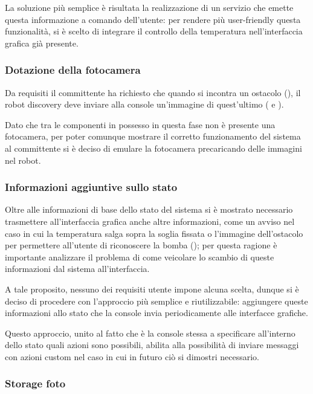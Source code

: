 La soluzione più semplice è risultata la realizzazione di un servizio che emette questa informazione a comando dell'utente:
per rendere più user-friendly questa funzionalità, si è scelto di integrare il controllo della temperatura nell'interfaccia grafica già presente.

\subsubsection{Dotazione della fotocamera}

Da requisiti il committente ha richiesto che quando si incontra un ostacolo (), il robot discovery deve inviare alla console un'immagine di quest'ultimo ( e ).

Dato che tra le componenti in possesso in questa fase non è presente una fotocamera, per poter comunque mostrare il corretto funzionamento del sistema al committente si è deciso di emulare la fotocamera precaricando delle immagini nel robot.

\subsubsection{Informazioni aggiuntive sullo stato}

Oltre alle informazioni di base dello stato del sistema si è mostrato necessario trasmettere all'interfaccia grafica anche altre informazioni, come un avviso nel caso in cui la temperatura salga sopra la soglia fissata o l'immagine dell'ostacolo per permettere all'utente di riconoscere la bomba ();
per questa ragione è importante analizzare il problema di come veicolare lo scambio di queste informazioni dal sistema all'interfaccia.

A tale proposito, nessuno dei requisiti utente impone alcuna scelta, dunque si è deciso di procedere con l'approccio più semplice e riutilizzabile:
aggiungere queste informazioni allo stato che la console invia periodicamente alle interfacce grafiche.

Questo approccio, unito al fatto che è la console stessa a specificare all'interno dello stato quali azioni sono possibili, abilita alla possibilità di inviare messaggi con azioni custom nel caso in cui in futuro ciò si dimostri necessario.

\subsubsection{Storage foto}

